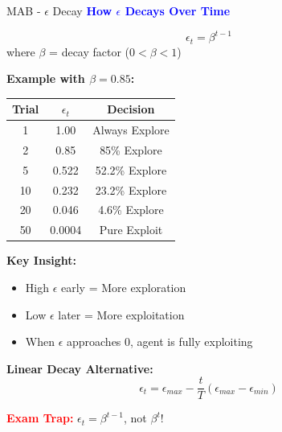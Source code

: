 \documentclass[8pt]{beamer}
\begin{document}
	\begin{frame}{MAB - $\epsilon$ Decay}
		\fontsize{6.5}{7.5}\selectfont
		\textcolor{blue}{\textbf{How $\epsilon$ Decays Over Time}}
		
		\[
		\epsilon_t = \beta^{t-1}
		\]
		where $\beta$ = decay factor ($0 < \beta < 1$)
		
		\textbf{Example with $\beta = 0.85$:}
		
		\begin{tabular}{|c|c|c|}
			\hline
			Trial & $\epsilon_t$ & Decision \\
			\hline
			1 & 1.00 & Always Explore \\
			\hline
			2 & 0.85 & 85\% Explore \\
			\hline
			5 & 0.522 & 52.2\% Explore \\
			\hline
			10 & 0.232 & 23.2\% Explore \\
			\hline
			20 & 0.046 & 4.6\% Explore \\
			\hline
			50 & 0.0004 & Pure Exploit \\
			\hline
		\end{tabular}
		
		\textbf{Key Insight:}
		\begin{itemize}
			\item High $\epsilon$ early = More exploration
			\item Low $\epsilon$ later = More exploitation
			\item When $\epsilon$ approaches 0, agent is fully exploiting
		\end{itemize}
		
		\textbf{Linear Decay Alternative:}
		\[
		\epsilon_t = \epsilon_{max} - \frac{t}{T}(\epsilon_{max} - \epsilon_{min})
		\]
		
		\textcolor{red}{\textbf{Exam Trap:}} $\epsilon_t = \beta^{t-1}$, not $\beta^t$!
	\end{frame}
	
\end{document}
